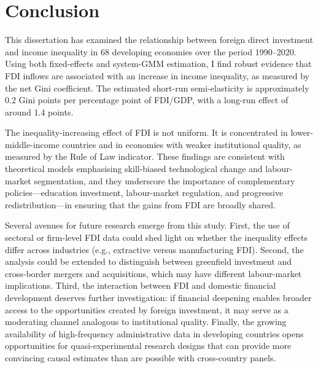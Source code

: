 \documentclass[12pt,a4paper]{article}
\begin{document}
\section{Conclusion}\label{sec:conclusion}

This dissertation has examined the relationship between foreign direct investment and income inequality in 68 developing economies over the period 1990--2020.  Using both fixed-effects and system-GMM estimation, I find robust evidence that FDI inflows are associated with an increase in income inequality, as measured by the net Gini coefficient.  The estimated short-run semi-elasticity is approximately 0.2 Gini points per percentage point of FDI/GDP, with a long-run effect of around 1.4 points.

The inequality-increasing effect of FDI is not uniform.  It is concentrated in lower-middle-income countries and in economies with weaker institutional quality, as measured by the Rule of Law indicator.  These findings are consistent with theoretical models emphasising skill-biased technological change and labour-market segmentation, and they underscore the importance of complementary policies---education investment, labour-market regulation, and progressive redistribution---in ensuring that the gains from FDI are broadly shared.

Several avenues for future research emerge from this study.  First, the use of sectoral or firm-level FDI data could shed light on whether the inequality effects differ across industries (e.g., extractive versus manufacturing FDI).  Second, the analysis could be extended to distinguish between greenfield investment and cross-border mergers and acquisitions, which may have different labour-market implications.  Third, the interaction between FDI and domestic financial development deserves further investigation: if financial deepening enables broader access to the opportunities created by foreign investment, it may serve as a moderating channel analogous to institutional quality.  Finally, the growing availability of high-frequency administrative data in developing countries opens opportunities for quasi-experimental research designs that can provide more convincing causal estimates than are possible with cross-country panels.
\end{document}
